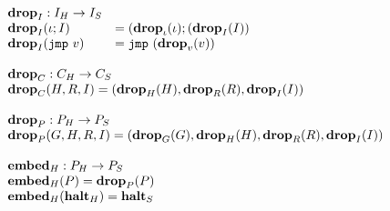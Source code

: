 {\[\begin{array}{l}
\begin{array}{ll}
\mathbf{drop}_{I} : {I_H} -> {I_S} \\
\mathbf{drop}_{I}(\iota ; I) &= (\mathbf{drop}_{\iota}(\iota) ; (\mathbf{drop}_{I}(I)) \\
\mathbf{drop}_{I}(\mathtt{jmp}\ v) &= \mathtt{jmp}\ (\mathbf{drop}_{v}(v))
\end{array} \\\\

\begin{array}{l}
\mathbf{drop}_{C} : {C_H} -> {C_S} \\
\mathbf{drop}_{C}(H, R, I) = (\mathbf{drop}_{H}(H), \mathbf{drop}_{R}(R), \mathbf{drop}_{I}(I)) \\\\

\mathbf{drop}_{P} : {P_H} -> {P_S} \\
\mathbf{drop}_{P}(G, H, R, I) = (\mathbf{drop}_{G}(G), \mathbf{drop}_{H}(H), \mathbf{drop}_{R}(R), \mathbf{drop}_{I}(I)) \\\\

{{\mathbf{embed}}_H} : {P_H} -> {P_S} \\
{{\mathbf{embed}}_H}(P) = \mathbf{drop}_{P}(P) \\
{{\mathbf{embed}}_H}({\mathbf{halt}_H}) = {\mathbf{halt}_S} \\
\end{array} \\\\

\end{array}\]
}
